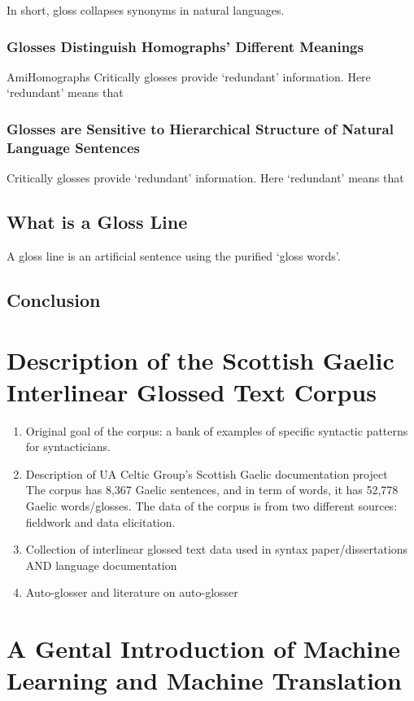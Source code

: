 \documentclass[final]{ua-thesis}
\numberwithin{equation}{section}
\begin{document}
In short, gloss collapses synonyms in natural languages. 

\subsection{Glosses Distinguish Homographs' Different Meanings}
AmiHomographs 
Critically glosses provide `redundant' information. Here `redundant' means that  

\subsection{Glosses are Sensitive to Hierarchical Structure of Natural Language Sentences}
Critically glosses provide `redundant' information. Here `redundant' means that  

\section{What is a Gloss Line}
A gloss line is an artificial sentence using the purified `gloss words'. 

\section{Conclusion} 

\chapter{Description of the Scottish Gaelic Interlinear Glossed Text Corpus}
\label{chap:Corpus}

	\begin{enumerate}
    \item Original goal of the corpus: a bank of examples of specific syntactic patterns for syntacticians.  
	\item Description of UA Celtic Group's Scottish Gaelic documentation project\\
	The corpus has 8,367 Gaelic sentences, and in term of words, it has 52,778 Gaelic words/glosses. The data of the corpus is from two different sources: fieldwork and data elicitation. 
    \item Collection of interlinear glossed text data used in syntax paper/dissertations AND language documentation
    \item Auto-glosser and literature on auto-glosser
	\end{enumerate}
\chapter{A Gental Introduction of Machine Learning and Machine Translation}
\label{chap:MT}
\end{document}
